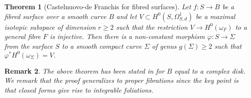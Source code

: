 \documentclass[a4paper,11pt]{amsart}
\newtheorem{theorem}{Theorem}[section]
\newtheorem{remark}[theorem]{Remark}
\begin{document}
{ 				
 				\begin{theorem}[Castelnuovo-de Franchis for fibred surfaces]\label{Thm-CdFL} Let $f:S\to B$ be a fibred surface over a smooth curve $B$ and let $V\subset H^0(S,\Omega^1_{S,d})$ be a maximal isotopic subspace of dimension $r\geq 2$ such that the restriction $V \to H^0(\omega_F)$ to a general fibre $F$ is injective. Then there is a non-constant morphism $\varphi : S\to \Sigma$ from the surface $S$ to a smooth compact curve $\Sigma$ of genus $g(\Sigma)\geq 2$ such that $\varphi^*H^0(\omega_{\Sigma})=V.$
 				\end{theorem}
 				\begin{remark} The above theorem has been stated in \cite{GonStopTor-On} for $B$ equal to a complex disk. We remark that the proof generalizes to proper fibrations since the key point is that closed forms give rise to integrable foliations.
 					\end{remark}    
 				
}
\end{document}
